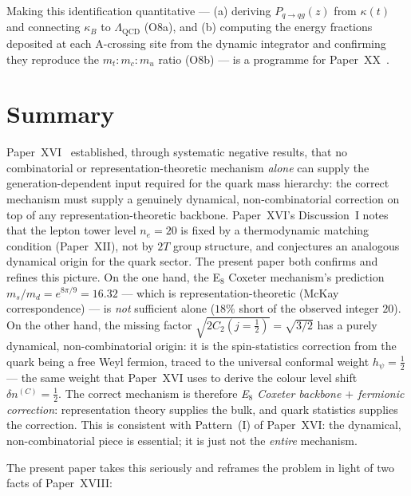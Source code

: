 \documentclass[11pt,a4paper]{article}
\theoremstyle{definition}\newtheorem{definition}[theorem]{Definition}
\theoremstyle{remark}
\newcommand{\twoT}{2T}
\begin{document}
\begin{enumerate}[leftmargin=2em,label=\textbf{O\arabic*.}]
Making this identification quantitative ---
(a) deriving $P_{q\to qg}(z)$ from $\kappa(t)$
    and connecting $\kappa_B$ to $\Lambda_{\mathrm{QCD}}$ (O8a), and
(b) computing the energy fractions deposited at each A-crossing
    site from the dynamic integrator and confirming they reproduce
    the $m_t:m_c:m_u$ ratio (O8b)
--- is a programme for Paper~XX~\cite{Paper20}.

\end{enumerate}

\section{Summary}
\label{P19:sec:summary}

Paper~XVI~\cite{Paper16} established, through systematic negative
results, that no combinatorial or representation-theoretic
mechanism \emph{alone} can supply the generation-dependent
input required for the quark mass hierarchy: the correct
mechanism must supply a genuinely dynamical, non-combinatorial
correction on top of any representation-theoretic backbone.
Paper~XVI's Discussion~I notes that the lepton tower level
$n_e=20$ is fixed by a thermodynamic matching condition
(Paper~XII), not by $\twoT$ group structure, and conjectures an
analogous dynamical origin for the quark sector.  The present
paper both confirms and refines this picture.  On the one hand,
the E$_8$ Coxeter mechanism's prediction $m_s/m_d=e^{8\pi/9}=16.32$
--- which is representation-theoretic (McKay correspondence) ---
is \emph{not} sufficient alone ($18\%$ short of the observed
integer $20$).  On the other hand, the missing factor
$\sqrt{2C_2(j=\tfrac12)}=\sqrt{3/2}$ has a purely dynamical,
non-combinatorial origin: it is the spin-statistics correction
from the quark being a free Weyl fermion, traced to the universal
conformal weight $h_\psi=\tfrac12$ --- the same weight that
Paper~XVI uses to derive the colour level shift $\delta
n^{(C)}=\tfrac12$.  The correct mechanism is therefore
\emph{E$_8$ Coxeter backbone $+$ fermionic correction}:
representation theory supplies the bulk, and quark statistics
supplies the correction.  This is consistent with Pattern~(I) of
Paper~XVI: the dynamical, non-combinatorial piece is essential;
it is just not the \emph{entire} mechanism.

The present paper takes this seriously and reframes the
problem in light of two facts of Paper~XVIII:
\end{document}
